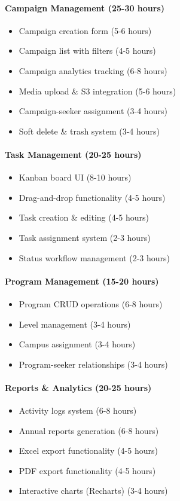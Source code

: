 \documentclass[11pt,a4paper]{article}
\begin{document}
\paragraph{Campaign Management (25-30 hours)}
\begin{itemize}
    \item Campaign creation form (5-6 hours)
    \item Campaign list with filters (4-5 hours)
    \item Campaign analytics tracking (6-8 hours)
    \item Media upload \& S3 integration (5-6 hours)
    \item Campaign-seeker assignment (3-4 hours)
    \item Soft delete \& trash system (3-4 hours)
\end{itemize}

\paragraph{Task Management (20-25 hours)}
\begin{itemize}
    \item Kanban board UI (8-10 hours)
    \item Drag-and-drop functionality (4-5 hours)
    \item Task creation \& editing (4-5 hours)
    \item Task assignment system (2-3 hours)
    \item Status workflow management (2-3 hours)
\end{itemize}

\paragraph{Program Management (15-20 hours)}
\begin{itemize}
    \item Program CRUD operations (6-8 hours)
    \item Level management (3-4 hours)
    \item Campus assignment (3-4 hours)
    \item Program-seeker relationships (3-4 hours)
\end{itemize}

\paragraph{Reports \& Analytics (20-25 hours)}
\begin{itemize}
    \item Activity logs system (6-8 hours)
    \item Annual reports generation (6-8 hours)
    \item Excel export functionality (4-5 hours)
    \item PDF export functionality (4-5 hours)
    \item Interactive charts (Recharts) (3-4 hours)
\end{itemize}
\end{document}
